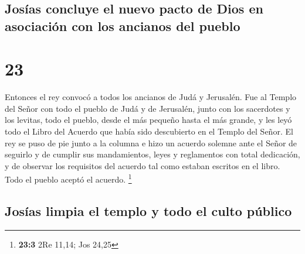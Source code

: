 \hypertarget{josuxedas-concluye-el-nuevo-pacto-de-dios-en-asociaciuxf3n-con-los-ancianos-del-pueblo}{%
\subsection{Josías concluye el nuevo pacto de Dios en asociación con los
ancianos del
pueblo}\label{josuxedas-concluye-el-nuevo-pacto-de-dios-en-asociaciuxf3n-con-los-ancianos-del-pueblo}}

\hypertarget{section-22}{%
\section{23}\label{section-22}}

 Entonces el rey convocó a todos los ancianos de Judá y
Jerusalén.  Fue al Templo del Señor con todo el pueblo de
Judá y de Jerusalén, junto con los sacerdotes y los levitas, todo el
pueblo, desde el más pequeño hasta el más grande, y les leyó todo el
Libro del Acuerdo que había sido descubierto en el Templo del Señor.
 El rey se puso de pie junto a la columna e hizo un
acuerdo solemne ante el Señor de seguirlo y de cumplir sus mandamientos,
leyes y reglamentos con total dedicación, y de observar los requisitos
del acuerdo tal como estaban escritos en el libro. Todo el pueblo aceptó
el acuerdo. \footnote{\textbf{23:3} 2Re 11,14; Jos 24,25}

\hypertarget{josuxedas-limpia-el-templo-y-todo-el-culto-puxfablico}{%
\subsection{Josías limpia el templo y todo el culto
público}\label{josuxedas-limpia-el-templo-y-todo-el-culto-puxfablico}}

